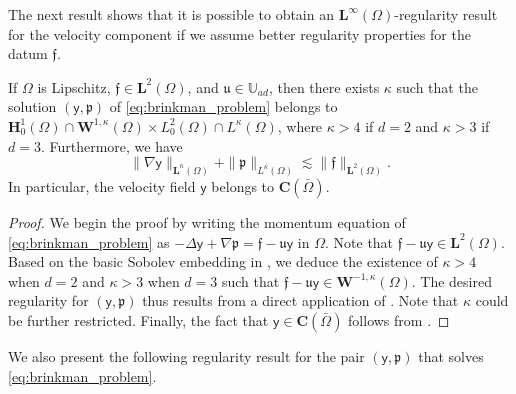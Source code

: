 \documentclass[final]{siamart0216}
\begin{document}
The next result shows that it is possible to obtain an $\mathbf{L}^{\infty}(\Omega)$-regularity result for the velocity component if we assume better regularity properties for the datum $\boldsymbol{\mathfrak{f}}$.

\begin{theorem}\label{theorem_regularity_Linfty}
If $\Omega$ is Lipschitz, $\boldsymbol{\mathfrak{f}}\in\mathbf{L}^2(\Omega)$, and $\mathfrak{u}\in \mathbb{U}_{ad}$, then there exists $\kappa$ such that the solution $(\boldsymbol{\mathsf{y}},\mathfrak{p})$ of \eqref{eq:brinkman_problem} belongs to $\mathbf{H}_0^{1}(\Omega) \cap \mathbf{W}^{1,\kappa}(\Omega) \times L_0^2(\Omega) \cap L^{\kappa}(\Omega)$, where $\kappa > 4$ if $d=2$ and $\kappa >3$ if $d=3$. Furthermore, we have
\begin{equation}\label{eq:estimate_extra}
\| \nabla \boldsymbol{\mathsf{y}}\|_{\mathbf{L}^{\kappa}(\Omega)} +\|\mathfrak{p}\|_{L^{\kappa}(\Omega)}
\lesssim \| \boldsymbol{\mathfrak{f}}\|_{\mathbf{L}^2(\Omega)}.
\end{equation}
In particular, the velocity field $\boldsymbol{\mathsf{y}}$ belongs to $\mathbf{C}(\bar \Omega)$.
\end{theorem}
\begin{proof}
We begin the proof by writing the momentum equation of \eqref{eq:brinkman_problem} as $-\Delta \boldsymbol{\mathsf{y}} +\nabla \mathfrak{p} = \boldsymbol{\mathfrak{f}} - \mathfrak{u} \boldsymbol{\mathsf{y}}$ in $\Omega$. Note that $\boldsymbol{\mathfrak{f}} - \mathfrak{u} \boldsymbol{\mathsf{y}} \in \mathbf{L}^2(\Omega)$. Based on the basic Sobolev embedding in \cite[Theorem 4.12, Part I, Case C]{MR2424078}, we deduce the existence of $\kappa > 4$ when $d=2$ and $\kappa >3$ when $d=3$ such that $\boldsymbol{\mathfrak{f}} - \mathfrak{u} \boldsymbol{\mathsf{y}} \in \mathbf{W}^{-1,\kappa}(\Omega)$. The desired regularity for $(\boldsymbol{\mathsf{y}},\mathfrak{p})$ thus results from a direct application of \cite[(1.52)]{MR2987056}. Note that $\kappa$ could be further restricted. Finally, the fact that $\boldsymbol{\mathsf{y}} \in \mathbf{C}(\bar \Omega)$ follows from \cite[Theorem 4.12, Part II]{MR2424078}.
\end{proof}

We also present the following regularity result for the pair $(\boldsymbol{\mathsf{y}},\mathfrak{p})$ that solves \eqref{eq:brinkman_problem}.
\end{document}
